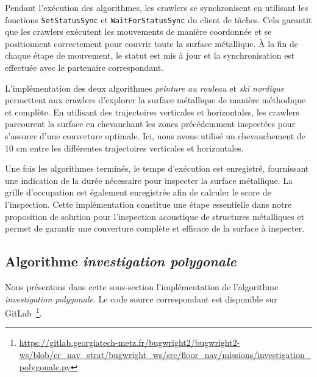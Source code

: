 \documentclass[francais,RandD]{rapportPFE}
\begin{document}
			Pendant l'exécution des algorithmes, les crawlers se synchronisent en utilisant les fonctions \texttt{SetStatusSync} et \texttt{WaitForStatusSync} du client de tâches.
			Cela garantit que les crawlers exécutent les mouvements de manière coordonnée et se positionnent correctement pour couvrir toute la surface métallique.
			À la fin de chaque étape de mouvement, le statut est mis à jour et la synchronisation est effectuée avec le partenaire correspondant.

			L'implémentation des deux algorithmes \textit{peinture au rouleau} et \textit{ski nordique} permettent aux crawlers d'explorer la surface métallique de manière méthodique et complète.
			En utilisant des trajectoires verticales et horizontales, les crawlers parcourent la surface en chevauchant les zones précédemment inspectées pour s'assurer d'une couverture optimale.
			Ici, nous avons utilisé un chevauchement de 10 cm entre les différentes trajectoires verticales et horizontales.

			Une fois les algorithmes terminés, le temps d'exécution est enregistré, fournissant une indication de la durée nécessaire pour inspecter la surface métallique.
			La grille d'occupation est également enregistrée afin de calculer le score de l'inspection.
			Cette implémentation constitue une étape essentielle dans notre proposition de solution pour l'inspection acoustique de structures métalliques et permet de garantir une couverture complète et efficace de la surface à inspecter.
		\subsection*{Algorithme \textit{investigation polygonale}}
			Nous présentons dans cette sous-section l'implémentation de l'algorithme \textit{investigation polygonale}.
			Le code source correspondant est disponible sur GitLab~\footnote{\url{https://gitlab.georgiatech-metz.fr/bugwright2/bugwright2-ws/blob/cr_nav_strat/bugwright_ws/src/floor_nav/missions/investigation_polygonale.py}}.
\end{document}
